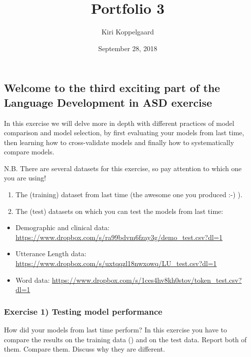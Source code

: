 \documentclass[]{article}
\title{Portfolio 3}
\author{Kiri Koppelgaard}
\date{September 28, 2018}
\providecommand{\tightlist}{%
  \setlength{\itemsep}{0pt}\setlength{\parskip}{0pt}}
\begin{document}
\maketitle

\subsection{Welcome to the third exciting part of the Language
Development in ASD
exercise}\label{welcome-to-the-third-exciting-part-of-the-language-development-in-asd-exercise}

In this exercise we will delve more in depth with different practices of
model comparison and model selection, by first evaluating your models
from last time, then learning how to cross-validate models and finally
how to systematically compare models.

N.B. There are several datasets for this exercise, so pay attention to
which one you are using!

\begin{enumerate}
\def\labelenumi{\arabic{enumi}.}
\tightlist
\item
  The (training) dataset from last time (the awesome one you produced
  :-) ).
\item
  The (test) datasets on which you can test the models from last time:
\end{enumerate}

\begin{itemize}
\tightlist
\item
  Demographic and clinical data:
  \url{https://www.dropbox.com/s/ra99bdvm6fzay3g/demo_test.csv?dl=1}
\item
  Utterance Length data:
  \url{https://www.dropbox.com/s/uxtqqzl18nwxowq/LU_test.csv?dl=1}
\item
  Word data:
  \url{https://www.dropbox.com/s/1ces4hv8kh0stov/token_test.csv?dl=1}
\end{itemize}

\subsubsection{Exercise 1) Testing model
performance}\label{exercise-1-testing-model-performance}

How did your models from last time perform? In this exercise you have to
compare the results on the training data () and on the test data. Report
both of them. Compare them. Discuss why they are different.
\end{document}
